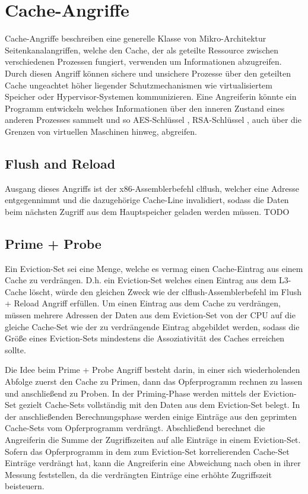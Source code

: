 \section{Cache-Angriffe}

Cache-Angriffe beschreiben eine generelle Klasse von Mikro-Architektur Seitenkanalangriffen, welche den Cache, der als geteilte Ressource zwischen verschiedenen Prozessen fungiert, verwenden um Informationen abzugreifen. Durch diesen Angriff können sichere und unsichere Prozesse über den geteilten Cache ungeachtet höher liegender Schutzmechanismen wie virtualisiertem Speicher oder Hypervisor-Systemen kommunizieren. Eine Angreiferin könnte ein Programm entwickeln welches Informationen über den inneren Zustand eines anderen Prozesses sammelt und so AES-Schlüssel \cite{BernsteinAES}, RSA-Schlüssel \cite{CacheAttackRSA}, auch über die Grenzen von virtuellen Maschinen hinweg, abgreifen.

\subsection{Flush and Reload}

Ausgang dieses Angriffs ist der x86-Assemblerbefehl clflush, welcher eine Adresse entgegennimmt und die dazugehörige Cache-Line invalidiert, sodass die Daten beim nächsten Zugriff aus dem Hauptspeicher geladen werden müssen. TODO

\subsection{Prime + Probe}

Ein Eviction-Set sei eine Menge, welche es vermag einen Cache-Eintrag aus einem Cache zu verdrängen. D.h. ein Eviction-Set welches einen Eintrag aus dem L3-Cache löscht, würde den gleichen Zweck wie der clflush-Assemblerbefehl im Flush + Reload Angriff erfüllen. 
Um einen Eintrag aus dem Cache zu verdrängen, müssen mehrere Adressen der Daten aus dem Eviction-Set von der CPU auf die gleiche Cache-Set wie der zu verdrängende Eintrag abgebildet werden, sodass die Größe eines Eviction-Sets mindestens die Assoziativität des Caches erreichen sollte.

Die Idee beim Prime + Probe Angriff besteht darin, in einer sich wiederholenden Abfolge zuerst den Cache zu Primen, dann das Opferprogramm rechnen zu lassen und anschließend zu Proben.
In der Priming-Phase werden mittels der Eviction-Set gezielt Cache-Sets vollständig mit den Daten aus dem Eviction-Set belegt.
In der anschließenden Berechnungsphase werden einige Einträge aus den geprimten Cache-Sets vom Opferprogramm verdrängt. Abschließend berechnet die Angreiferin die Summe der Zugriffszeiten auf alle Einträge in einem Eviction-Set.
Sofern das Opferprogramm in dem zum Eviction-Set korrelierenden Cache-Set Einträge verdrängt hat, kann die Angreiferin eine Abweichung nach oben in ihrer Messung feststellen, da die verdrängten Einträge eine erhöhte Zugriffszeit beisteuern.


